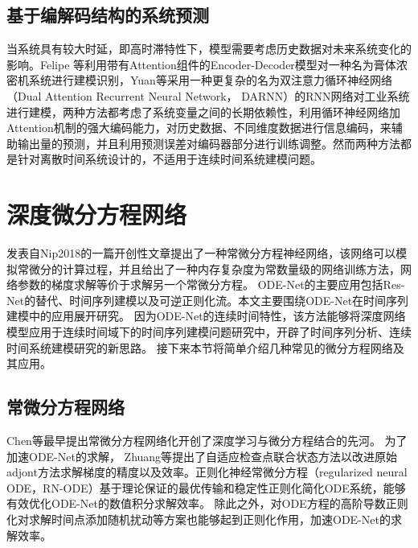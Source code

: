 \subsection{基于编解码结构的系统预测}
当系统具有较大时延，即高时滞特性下，模型需要考虑历史数据对未来系统变化的影响。Felipe 等\cite{demeester2020system}利用带有Attention组件的Encoder-Decoder模型对一种名为膏体浓密机系统进行建模识别，Yuan等\cite{Yuan2020}采用一种更复杂的名为双注意力循环神经网络（Dual Attention Recurrent Neural Network， DARNN）的RNN网络对工业系统进行建模，两种方法都考虑了系统变量之间的长期依赖性，利用循环神经网络加Attention机制的强大编码能力，对历史数据、不同维度数据进行信息编码，来辅助输出量的预测，并且利用预测误差对编码器部分进行训练调整。然而两种方法都是针对离散时间系统设计的，不适用于连续时间系统建模问题。
\section{深度微分方程网络}
发表自Nip2018的一篇开创性文章\cite{chen2018neural}提出了一种常微分方程神经网络，该网络可以模拟常微分的计算过程，并且给出了一种内存复杂度为常数量级的网络训练方法，网络参数的梯度求解等价于求解另一个常微分方程。
ODE-Net的主要应用包括Res-Net的替代、时间序列建模以及可逆正则化流\cite{Grathwohl2019}。本文主要围绕ODE-Net在时间序列建模中的应用展开研究。
因为ODE-Net的连续时间特性，该方法能够将深度网络模型应用于连续时间域下的时间序列建模问题研究中，开辟了时间序列分析、连续时间系统建模研究的新思路。
接下来本节将简单介绍几种常见的微分方程网络及其应用。
\subsection{常微分方程网络}
Chen等最早提出常微分方程网络化\cite{chen2018neural}开创了深度学习与微分方程结合的先河。
为了加速ODE-Net的求解，
Zhuang等\cite{Zhuang2020}提出了自适应检查点联合状态方法以改进原始adjont方法求解梯度的精度以及效率。正则化神经常微分方程（regularized neural ODE，RN-ODE）\cite{J2020}基于理论保证的最优传输和稳定性正则化简化ODE系统，能够有效优化ODE-Net的数值积分求解效率。
除此之外，对ODE方程的高阶导数正则化\cite{kelly2020}对求解时间点添加随机扰动\cite{Ghosh2020}等方案也能够起到正则化作用，加速ODE-Net的求解效率。

